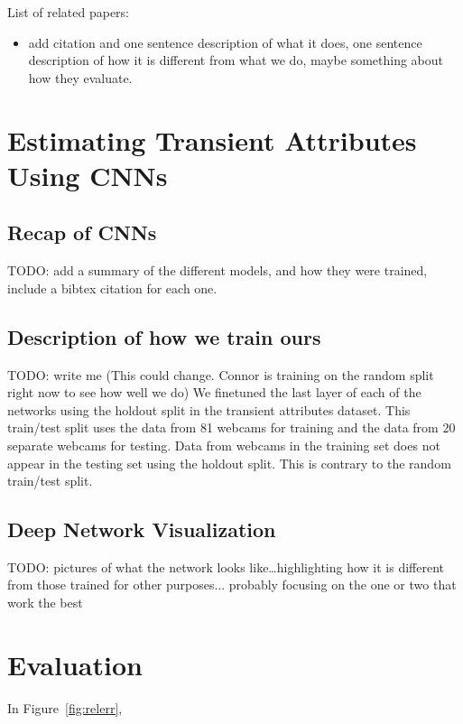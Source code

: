 \documentclass{article}
\newcommand{\figref}[1]{Figure~\ref{fig:#1}}
\begin{document}
List of related papers:
\begin{itemize}

  \item add citation and one sentence description of what it does, one
    sentence description of how it is different from what we do, maybe
    something about how they evaluate.

\end{itemize}

\section{Estimating Transient Attributes Using CNNs}

\subsection{Recap of CNNs}

TODO: add a summary of the different models, and how they were
trained, include a bibtex citation for each one.

\subsection{Description of how we train ours}

TODO: write me\newline 
(This could change. Connor is training on the random split right now
to see how well we do)\newline
We finetuned the last layer of each of the networks using the holdout 
split in the transient attributes dataset.  This train/test split uses
the data from 81 webcams for training and the data from 20 separate 
webcams for testing.  Data from webcams in the training set does not
appear in the testing set using the holdout split.  This is contrary to 
the random train/test split.  

\subsection{Deep Network Visualization}

TODO: pictures of what the network looks like\dots highlighting how it
is different from those trained for other purposes... probably
focusing on the one or two that work the best

\section{Evaluation}
In \figref{relerr},  
%
%
%
\end{document}
